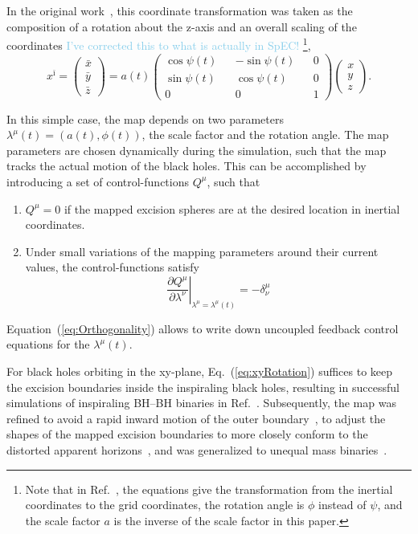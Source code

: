 \documentclass[aps, prd, amsmath, floats, floatfix, twocolumn,superscriptaddress, nofootinbib, showpacs]{revtex4-1}
\theoremstyle{plain}
\theoremstyle{definition}
\newcommand{\larry}[1]{\textcolor{SkyBlue}{#1}}
\begin{document}
In the original work~\cite{Scheel2006}, this coordinate transformation
was taken as the composition of a rotation about the z-axis and an
overall scaling of the coordinates \larry{I've corrected this to what
is actually in SpEC!}  \footnote{Note that in Ref.~\cite{Scheel2006},
the equations give the transformation from the inertial coordinates to
the grid coordinates, the rotation angle is $\phi$ instead of $\psi$,
and the scale factor $a$ is the inverse of the scale factor in this
paper.},
\begin{equation}\label{eq:xyRotation}
x^{\bar\imath}=
\left(
\begin{aligned}
\bar x \\ \bar y \\ \bar z
\end{aligned}
\right)
=a(t)\left(
\begin{aligned}
\cos{\psi(t)} && - \sin{\psi(t)} && 0 \\
\sin{\psi(t)} && \cos{\psi(t)}&& 0 \\
0& & 0 && 1
\end{aligned}
 \right)
\left(
\begin{aligned}
x \\ y \\ z
\end{aligned}
\right).
\end{equation}

In this simple case, the map depends on two parameters
$\lambda^\mu(t)=(a(t), \phi(t))$, the scale factor and the rotation
angle.  The map parameters are chosen dynamically during the
simulation, such that the map tracks the actual motion of the black
holes.  This can be accomplished by introducing a set of control-functions
$Q^\mu$, such that
\begin{enumerate}
\item $Q^\mu=0$ if the mapped excision spheres are at the desired location in inertial coordinates.
\item Under small variations of the mapping parameters around their current values, the control-functions satisfy
\begin{equation}\label{eq:Orthogonality}
\left.\frac{\partial Q^\mu}{\partial \lambda^\nu}\right|
_{\lambda^\mu=\lambda^\mu(t)}
= -\delta^\mu_\nu
\end{equation}
\end{enumerate}
Equation~(\ref{eq:Orthogonality}) allows to write down uncoupled feedback
control equations for the $\lambda^\mu(t)$.

For black holes orbiting in the xy-plane, Eq.~(\ref{eq:xyRotation})
suffices to keep the excision boundaries inside the inspiraling black
holes, resulting in successful simulations of inspiraling BH--BH
binaries in Ref.~\cite{Pfeiffer-Brown-etal:2007}.  Subsequently, the
map was refined to avoid a rapid inward motion of the outer
boundary~\cite{Scheel2008}, to adjust the shapes of the mapped
excision boundaries to more closely conform to the distorted apparent
horizons~\cite{Szilagyi:2009qz}, and was generalized to unequal mass
binaries~\cite{Buchman-etal-in-prep}.  
\end{document}
